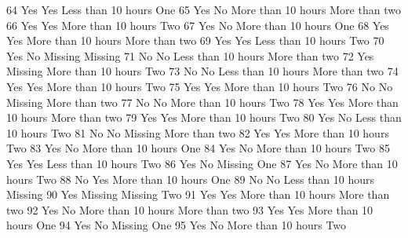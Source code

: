 \documentclass[
  letterpaper,
  DIV=11,
  numbers=noendperiod]{scrreprt}
\newenvironment{Shaded}{\begin{snugshade}}{\end{snugshade}}
\newcommand{\NormalTok}[1]{\textcolor[rgb]{0.00,0.23,0.31}{#1}}
\begin{document}
\begin{Shaded}
\begin{Highlighting}[]
\NormalTok{64                Yes            Yes Less than 10 hours           One}
\NormalTok{65                Yes             No More than 10 hours More than two}
\NormalTok{66                Yes            Yes More than 10 hours           Two}
\NormalTok{67                Yes             No More than 10 hours           One}
\NormalTok{68                Yes            Yes More than 10 hours More than two}
\NormalTok{69                Yes            Yes Less than 10 hours           Two}
\NormalTok{70                Yes             No            Missing       Missing}
\NormalTok{71                 No             No Less than 10 hours More than two}
\NormalTok{72                Yes        Missing More than 10 hours           Two}
\NormalTok{73                 No             No Less than 10 hours More than two}
\NormalTok{74                Yes            Yes More than 10 hours           Two}
\NormalTok{75                Yes            Yes More than 10 hours           Two}
\NormalTok{76                 No             No            Missing More than two}
\NormalTok{77                 No             No More than 10 hours           Two}
\NormalTok{78                Yes            Yes More than 10 hours More than two}
\NormalTok{79                Yes            Yes More than 10 hours           Two}
\NormalTok{80                Yes             No Less than 10 hours           Two}
\NormalTok{81                 No             No            Missing More than two}
\NormalTok{82                Yes            Yes More than 10 hours           Two}
\NormalTok{83                Yes             No More than 10 hours           One}
\NormalTok{84                Yes             No More than 10 hours           Two}
\NormalTok{85                Yes            Yes Less than 10 hours           Two}
\NormalTok{86                Yes             No            Missing           One}
\NormalTok{87                Yes             No More than 10 hours           Two}
\NormalTok{88                 No            Yes More than 10 hours           One}
\NormalTok{89                 No             No Less than 10 hours       Missing}
\NormalTok{90                Yes        Missing            Missing           Two}
\NormalTok{91                Yes            Yes More than 10 hours More than two}
\NormalTok{92                Yes             No More than 10 hours More than two}
\NormalTok{93                Yes            Yes More than 10 hours           One}
\NormalTok{94                Yes             No            Missing           One}
\NormalTok{95                Yes             No More than 10 hours           Two}

\end{Highlighting}
\end{Shaded}
\end{document}
